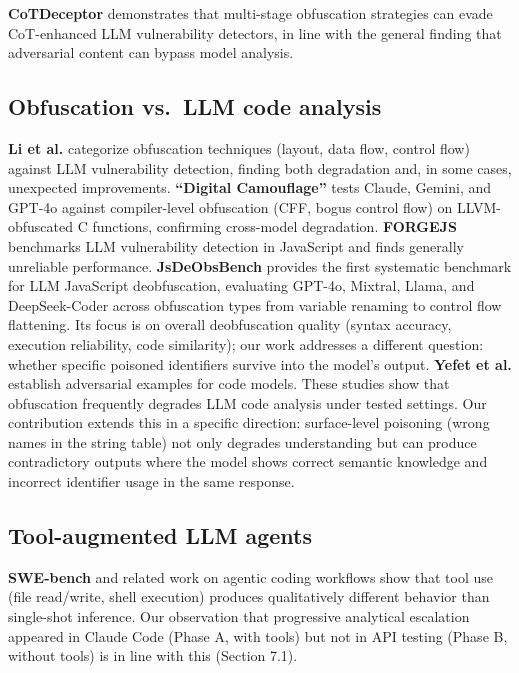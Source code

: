 \documentclass[11pt]{article}
\begin{document}
\textbf{CoTDeceptor} \cite{cotdeceptor} demonstrates that multi-stage obfuscation
strategies can evade CoT-enhanced LLM vulnerability detectors,
in line with the general finding that adversarial content can
bypass model analysis.

\subsection{Obfuscation vs.\ LLM code analysis}

\textbf{Li et al.} \cite{li2025} categorize obfuscation techniques (layout, data
flow, control flow) against LLM vulnerability detection, finding
both degradation and, in some cases, unexpected improvements.
\textbf{``Digital Camouflage''} \cite{digitalcamo} tests Claude, Gemini, and GPT-4o
against compiler-level obfuscation (CFF, bogus control flow) on
LLVM-obfuscated C functions, confirming cross-model degradation.
\textbf{FORGEJS} \cite{forgejs} benchmarks LLM vulnerability detection in JavaScript
and finds generally unreliable performance. \textbf{JsDeObsBench} \cite{jsdeobsbench}
provides the first systematic benchmark for LLM JavaScript
deobfuscation, evaluating GPT-4o, Mixtral, Llama, and DeepSeek-Coder
across obfuscation types from variable renaming to control flow
flattening. Its focus is on overall deobfuscation quality (syntax
accuracy, execution reliability, code similarity); our work addresses
a different question: whether specific poisoned identifiers survive
into the model's output. \textbf{Yefet et al.} \cite{yefet2020}
establish adversarial examples for code models. These studies show that obfuscation frequently degrades LLM code
analysis under tested settings. Our contribution extends this in a
specific direction: surface-level
poisoning (wrong names in the string table) not only degrades
understanding but can produce contradictory outputs where the
model shows correct semantic knowledge and incorrect identifier
usage in the same response.

\subsection{Tool-augmented LLM agents}

\textbf{SWE-bench} \cite{swebench} and related work on agentic coding workflows show
that tool use (file read/write, shell execution) produces qualitatively
different behavior than single-shot inference. Our observation that
progressive analytical escalation appeared in Claude Code (Phase A,
with tools) but not in API testing (Phase B, without tools) is
in line with this (Section 7.1).
\end{document}
